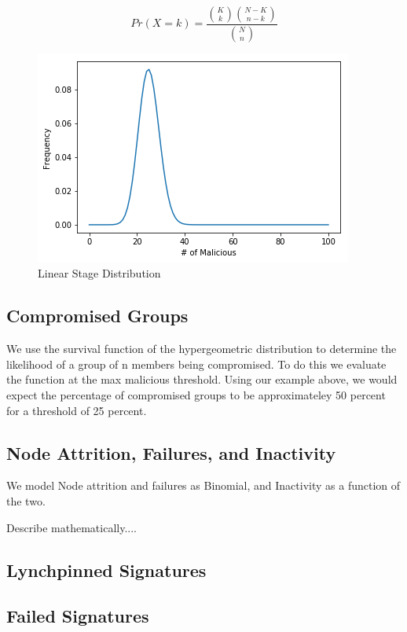\documentclass[conference]{IEEEtran}
\begin{document}
\begin{equation}
    Pr(X = k) = \frac{{K \choose k} {N-K\choose n-k}}{{N \choose n}}
\end{equation}

\begin{figure}[h!]
    \includegraphics[width=\linewidth]{hypergeometric.png}
    \caption{Linear Stage Distribution}
    \label{fig: hypergeometric_distribution}
\end{figure}


\subsection{Compromised Groups}
We use the survival function of the hypergeometric distribution to determine
the likelihood of a group of n members being compromised. To do this we evaluate
the function at the max malicious threshold. Using our example above, we would
expect the percentage of compromised groups to be approximateley 50 percent
for a threshold of 25 percent. 

\subsection{Node Attrition, Failures, and Inactivity}
We model Node attrition and failures as Binomial, and Inactivity as a function of 
the two.

Describe mathematically....

\subsection{Lynchpinned Signatures}


\subsection{Failed Signatures}
\end{document}
